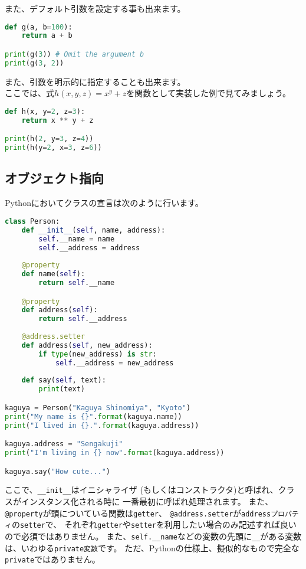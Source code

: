 			また、デフォルト引数を設定する事も出来ます。
\begin{lstlisting}[language=python, basicstyle=\ttfamily, frame=single, tabsize=4]
def g(a, b=100):
	return a + b

print(g(3))	# Omit the argument b
print(g(3, 2))
\end{lstlisting}
			
			また、引数を明示的に指定することも出来ます。\\
			ここでは、式$h(x, y, z) = x^y + z$を関数として実装した例で見てみましょう。
\begin{lstlisting}[language=python, basicstyle=\ttfamily, frame=single, tabsize=4]
def h(x, y=2, z=3):
	return x ** y + z

print(h(2, y=3, z=4))
print(h(y=2, x=3, z=6))
\end{lstlisting}
		
		\newpage
		\subsection{オブジェクト指向}
			Pythonにおいてクラスの宣言は次のように行います。
\begin{lstlisting}[language=python, basicstyle=\ttfamily, frame=single, tabsize=4]
class Person:
	def __init__(self, name, address):
		self.__name = name
		self.__address = address
	
	@property
	def name(self):
		return self.__name

	@property
	def address(self):
		return self.__address
		
	@address.setter
	def address(self, new_address):
		if type(new_address) is str:
			self.__address = new_address
			
	def say(self, text):
		print(text)

kaguya = Person("Kaguya Shinomiya", "Kyoto")
print("My name is {}".format(kaguya.name))
print("I lived in {}.".format(kaguya.address))

kaguya.address = "Sengakuji"
print("I'm living in {} now".format(kaguya.address))

kaguya.say("How cute...")
\end{lstlisting}
			
			ここで、\texttt{\_\_init\_\_}はイニシャライザ
			(もしくはコンストラクタ)と呼ばれ、クラスがインスタンス化される時に
			一番最初に呼ばれ処理されます。
			また、\texttt{@property}が頭についている関数は\texttt{getter}、
			\texttt{@address.setter}が\texttt{addressプロパティ}の\texttt{setter}で、
			それぞれ\texttt{getter}や\texttt{setter}を利用したい場合のみ記述すれば良いので必須ではありません。
			また、\texttt{self.\_\_name}などの変数の先頭に\texttt{\_\_}がある変数は、いわゆる\texttt{private変数}です。
			ただ、Pythonの仕様上、擬似的なもので完全な\texttt{private}ではありません。
			
